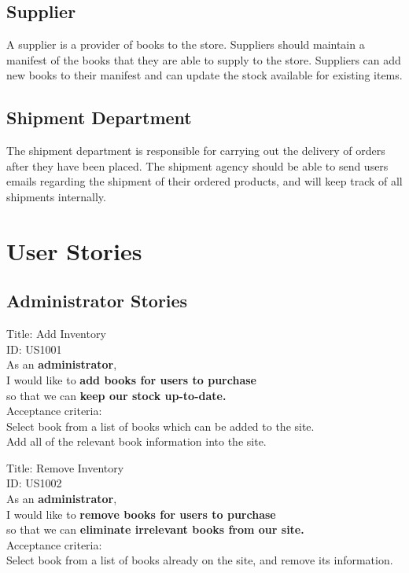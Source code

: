 \documentclass{article}
\begin{document}
\subsection{Supplier}
A supplier is a provider of books to the store. Suppliers should maintain a manifest of the books that they are able to supply to the store. Suppliers can add new books to their manifest and can update the stock available for existing items. 


\subsection{Shipment Department}
The shipment department is responsible for carrying out the delivery of orders after they have been placed. The shipment agency should be able to send users emails regarding the shipment of their ordered products, and will keep track of all shipments internally. 


\section{User Stories}

\subsection{Administrator Stories}

\begin{framed}
\noindent
Title: Add Inventory\\
ID: US1001 \\
As an \textbf{administrator},\\
 \textbullet  \quad \quad I would like to \textbf{add books for users to purchase}\\ 
 \textbullet  \quad \quad so that we can \textbf{keep our stock up-to-date.}\\
 Acceptance criteria: \\
  \textbullet  \quad \quad Select book from a list of books which can be added to the site.\\
  \textbullet  \quad \quad Add all of the relevant book information into the site. 
\end{framed}

\begin{framed}
\noindent
Title: Remove Inventory\\
ID: US1002 \\
As an \textbf{administrator},\\
 \textbullet  \quad \quad I would like to \textbf{remove books for users to purchase}\\ 
 \textbullet  \quad \quad so that we can \textbf{eliminate irrelevant books from our site.}\\
 Acceptance criteria: \\
  \textbullet  \quad \quad Select book from a list of books already on the site, and remove its information.
\end{framed}
\end{document}
